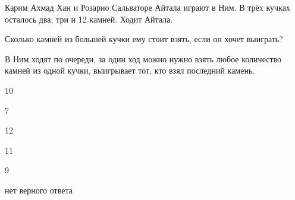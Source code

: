 
\begin{question}
Карим Ахмад Хан и Розарио Сальваторе Айтала играют в Ним.
В трёх кучках осталось два, три и 12 камней. Ходит Айтала.

Сколько камней из большей кучки ему стоит взять, если он хочет выиграть?

В Ним ходят по очереди, за один ход можно нужно взять любое количество камней из одной кучки, выигрывает тот, кто взял последний камень.
\begin{answerlist}
  \item 10
  \item 7
  \item 12
  \item 11
  \item 9
  \item нет верного ответа
\end{answerlist}
\end{question}


